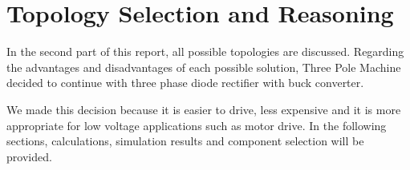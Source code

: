 \section{Topology Selection and Reasoning}
In the second part of this report, all possible topologies are discussed. Regarding the advantages and disadvantages of each possible solution, Three Pole Machine decided to continue with three phase diode rectifier with buck converter.

We made this decision because it is easier to drive, less expensive and it is more appropriate for low voltage applications such as motor drive. In the following sections, calculations, simulation results and component selection will be provided.